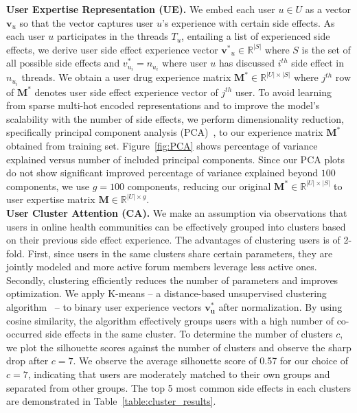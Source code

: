 \documentclass{bmcart}
\begin{document}
\textbf{User Expertise Representation (UE).}  We embed each user $u
\in U$ as a vector $\boldsymbol{v}_{u}$ so that the vector captures
user $u$'s experience with certain side effects. As each user $u$
participates in the threads $T_u$, entailing a list of experienced
side effects, we derive user side effect experience vector $\boldsymbol{v^{\ast}}_{u}
\in \mathbb{R}^{|S|}$ where $S$ is the set of all possible side effects and
$v^{\ast}_{u_i}=n_{u_i}$ where user $u$ has discussed $i^{th}$ side effect in $n_{u_i}$ threads. We obtain a user drug experience matrix
$\boldsymbol{M}^{\ast} \in \mathbb{R}^{|U|\times|S|}$ where $j^{th}$
row of $\boldsymbol{M}^{\ast}$ denotes user side effect experience vector of $j^{th}$ user. To avoid learning from sparse multi-hot encoded representations and to improve the model's scalability with the number of side effects, we perform  dimensionality reduction, specifically principal component analysis (PCA)~\cite{jolliffe1986principal}, to our experience matrix $\boldsymbol{M}^{\ast}$ obtained from training set.
Figure~\ref{fig:PCA} shows percentage of variance explained versus
number of included principal components. Since our PCA plots do not show significant improved percentage of variance explained beyond $100$ components, we use $g=100$ components, reducing
our original $\boldsymbol{M}^{\ast}\in \mathbb{R}^{|U|\times|S|}$ to
user expertise matrix $\boldsymbol{M} \in \mathbb{R}^{|U| \times g}$. \\

\textbf{User Cluster Attention (CA).} We make an assumption via observations that users in online health communities can be effectively grouped into clusters based on their previous side effect experience. The advantages of clustering users is of 2-fold. First, since users in the same clusters share certain parameters, they are jointly modeled and more active forum members leverage less active ones. Secondly, clustering efficiently reduces the number of parameters and improves optimization. We apply K-means -- a distance-based unsupervised clustering algorithm~\cite{MacQueen67} -- to binary user experience vectors $\boldsymbol{v^*_u}$ after normalization. 
By using cosine similarity, 
the algorithm effectively groups users with a high number of co-occurred side effects in the same cluster. To determine the number of clusters $c$, we plot the silhouette scores against the number of clusters and %
observe the sharp drop after $c=7$. 
We observe the average silhouette score of 0.57 for our choice of $c=7$, indicating that users are moderately matched to their own groups and separated from other groups. The top 5 most common side effects in each clusters are demonstrated in Table~\ref{table:cluster_results}.
\end{document}
